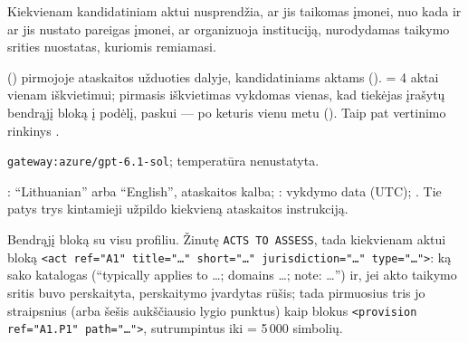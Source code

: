 Kiekvienam kandidatiniam aktui nusprendžia, ar jis taikomas įmonei,
nuo kada ir ar jis nustato pareigas įmonei, ar organizuoja instituciją, nurodydamas taikymo
srities nuostatas, kuriomis remiamasi.

  () pirmojoje
ataskaitos užduoties  dalyje, kandidatiniams aktams
().  = 4 aktai vienam iškvietimui; pirmasis
iškvietimas vykdomas vienas, kad tiekėjas įrašytų bendrąjį bloką į podėlį, paskui --- po keturis
vienu metu (). Taip pat vertinimo rinkinys .

 \texttt{gateway:azure/gpt-6.1-sol}; temperatūra
nenustatyta.

 : \enquote{Lithuanian} arba \enquote{English},
ataskaitos kalba; : vykdymo data (UTC); . Tie patys trys
kintamieji užpildo kiekvieną ataskaitos instrukciją.

 Bendrąjį bloką  su visu profiliu. Žinutę
\texttt{ACTS TO ASSESS}, tada kiekvienam aktui bloką
\texttt{<act ref="A1" title="…" short="…" jurisdiction="…" type="…">}: ką sako katalogas
(\enquote{typically applies to …; domains …; note: …}) ir, jei akto taikymo sritis buvo
perskaityta, perskaitymo įvardytas rūšis; tada pirmuosius tris jo straipsnius (arba šešis
aukščiausio lygio punktus) kaip blokus \texttt{<provision ref="A1.P1" path="…">}, sutrumpintus
iki  = 5\,000 simbolių.

